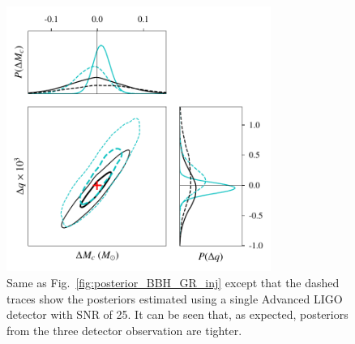 \documentclass[prd,preprintnumbers,twocolumn,eqsecnum,floatfix,a4paper,nofootinbib,superscriptaddress]{revtex4}
\begin{document}
\begin{figure}[tb] \begin{center}
		\includegraphics[width=3.4in]{figs/hm_mcq_1det_3det_compare_GR.pdf}
		\caption{Same as Fig.~\ref{fig:posterior_BBH_GR_inj} except that the dashed traces show the posteriors estimated using a single Advanced LIGO detector with SNR of 25. It can be seen that, as expected, posteriors from the three detector observation are tighter.}
		\label{fig:hm_mcq_compare-1det_3det_GR_inj}
	\end{center} \end{figure}
\end{document}
